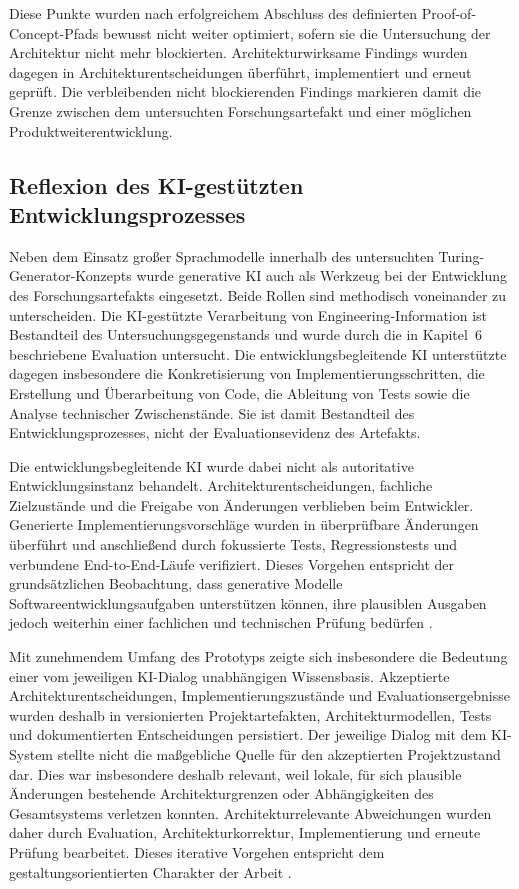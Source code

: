 Diese Punkte wurden nach erfolgreichem Abschluss des definierten
Proof-of-Concept-Pfads bewusst nicht weiter optimiert, sofern sie die
Untersuchung der Architektur nicht mehr blockierten. Architekturwirksame
Findings wurden dagegen in Architekturentscheidungen überführt, implementiert
und erneut geprüft. Die verbleibenden nicht blockierenden Findings markieren
damit die Grenze zwischen dem untersuchten Forschungsartefakt und einer
möglichen Produktweiterentwicklung.

\subsection{Reflexion des KI-gestützten Entwicklungsprozesses}
\label{sec:discussion_ai_assisted_development}

Neben dem Einsatz großer Sprachmodelle innerhalb des untersuchten
Turing-Generator-Konzepts wurde generative KI auch als Werkzeug bei der
Entwicklung des Forschungsartefakts eingesetzt. Beide Rollen sind methodisch
voneinander zu unterscheiden. Die KI-gestützte Verarbeitung von
Engineering-Information ist Bestandteil des Untersuchungsgegenstands und
wurde durch die in Kapitel~6 beschriebene Evaluation untersucht. Die
entwicklungsbegleitende KI unterstützte dagegen insbesondere die
Konkretisierung von Implementierungsschritten, die Erstellung und
Überarbeitung von Code, die Ableitung von Tests sowie die Analyse technischer
Zwischenstände. Sie ist damit Bestandteil des Entwicklungsprozesses, nicht der
Evaluationsevidenz des Artefakts.

Die entwicklungsbegleitende KI wurde dabei nicht als autoritative
Entwicklungsinstanz behandelt. Architekturentscheidungen, fachliche
Zielzustände und die Freigabe von Änderungen verblieben beim Entwickler.
Generierte Implementierungsvorschläge wurden in überprüfbare Änderungen
überführt und anschließend durch fokussierte Tests, Regressionstests und
verbundene End-to-End-Läufe verifiziert. Dieses Vorgehen entspricht der
grundsätzlichen Beobachtung, dass generative Modelle
Softwareentwicklungsaufgaben unterstützen können, ihre plausiblen Ausgaben
jedoch weiterhin einer fachlichen und technischen Prüfung bedürfen
\cite{Barke2023,Sergeyuk2025}.

Mit zunehmendem Umfang des Prototyps zeigte sich insbesondere die Bedeutung
einer vom jeweiligen KI-Dialog unabhängigen Wissensbasis. Akzeptierte
Architekturentscheidungen, Implementierungszustände und
Evaluationsergebnisse wurden deshalb in versionierten Projektartefakten,
Architekturmodellen, Tests und dokumentierten Entscheidungen persistiert.
Der jeweilige Dialog mit dem KI-System stellte nicht die maßgebliche Quelle
für den akzeptierten Projektzustand dar. Dies war insbesondere deshalb
relevant, weil lokale, für sich plausible Änderungen bestehende
Architekturgrenzen oder Abhängigkeiten des Gesamtsystems verletzen konnten.
Architekturrelevante Abweichungen wurden daher durch Evaluation,
Architekturkorrektur, Implementierung und erneute Prüfung bearbeitet. Dieses
iterative Vorgehen entspricht dem gestaltungsorientierten Charakter der
Arbeit \cite{Wieringa2014}.

